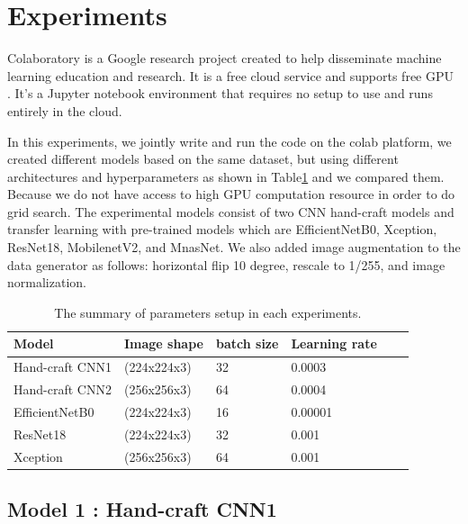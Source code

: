 \documentclass[conference]{IEEEtran}
\begin{document}
\section{Experiments}
Colaboratory is a Google research project created to help disseminate machine learning education and research. It is a free cloud service and supports free GPU . It's a Jupyter notebook environment that requires no setup to use and runs entirely in the cloud.

In this experiments, we jointly write and run the code on the colab platform, we created different models based on the same dataset, but using different architectures and hyperparameters as shown in Table\ref{T1} and we compared them. Because we do not have access to high GPU computation resource in order to do grid search. The experimental models consist of two CNN hand-craft models and transfer learning with pre-trained models which are EfficientNetB0, Xception, ResNet18, MobilenetV2, and MnasNet. We also added image augmentation to the data generator as follows: horizontal flip 10 degree, rescale to 1/255, and image normalization. 

\begin{table}[h]\centering
\caption{The summary of parameters setup in each experiments.}\label{T1}
\begin{tabularx}{\linewidth}{l l l l l l}
\toprule
Model&Image shape&batch size&Learning rate\\
\midrule
Hand-craft CNN1&(224x224x3)&32&0.0003\\
Hand-craft CNN2&(256x256x3)&64& 0.0004\\
EfficientNetB0&(224x224x3)&16& 0.00001\\
ResNet18&(224x224x3)&32& 0.001\\
Xception&(256x256x3)&64& 0.001\\
\bottomrule
\end{tabularx}
\end{table}


\subsection{Model 1 : Hand-craft CNN1}
\end{document}
